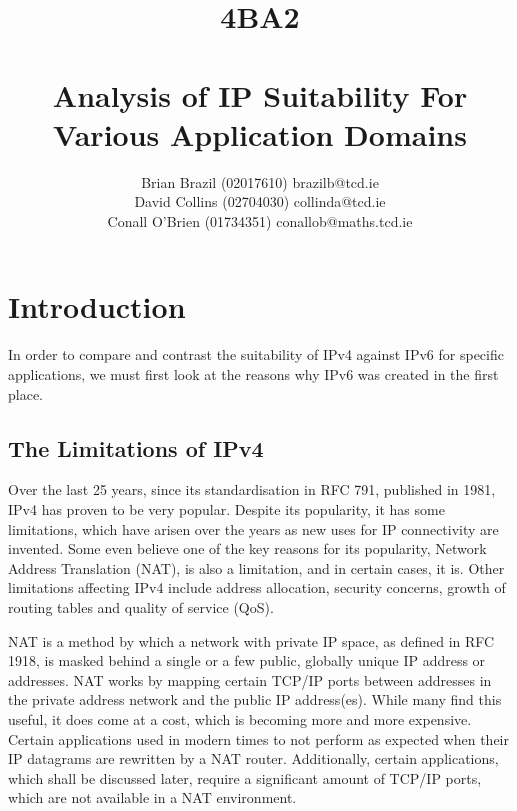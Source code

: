 \documentclass[a4paper,12pt]{article}
\begin{document}
\title{4BA2 \\ \hspace{5mm} \\ Analysis of IP Suitability For Various Application Domains}

\author{Brian Brazil (02017610) brazilb@tcd.ie \\
David Collins (02704030) collinda@tcd.ie \\
Conall O'Brien (01734351) conallob@maths.tcd.ie}

\maketitle

\pagebreak 

\tableofcontents

\pagebreak 

\section{Introduction}

In order to compare and contrast the suitability of IPv4 against IPv6
for specific applications, we must first look at the reasons why IPv6
was created in the first place.

\subsection{The Limitations of IPv4}

Over the last 25 years, since its standardisation in RFC 791, published
in 1981, IPv4 has proven to be very popular. Despite its popularity, it 
has some limitations, which have arisen over the years as new uses for 
IP connectivity are invented. Some even believe one of the key reasons
for its popularity, Network Address Translation (NAT), is also a 
limitation, and in certain cases, it is. Other limitations
affecting IPv4 include address allocation, security concerns, growth of 
routing tables and quality of service (QoS).


NAT is a method by which a network with private IP space, as defined in
RFC 1918, is masked behind a single or a few public, globally unique IP
address or addresses. NAT works by mapping certain TCP/IP ports between
addresses in the private address network and the public IP address(es).
While many find this useful, it does come at a cost, which is becoming
more and more expensive. Certain applications used in modern times to
not perform as expected when their IP datagrams are rewritten by a NAT
router. Additionally, certain applications, which shall be discussed
later, require a significant amount of TCP/IP ports, which are not
available in a NAT environment.
\end{document}
